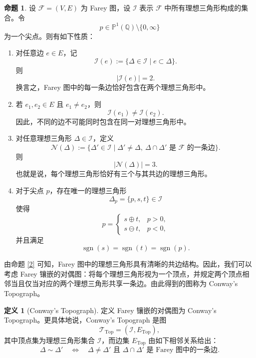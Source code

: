 \documentclass[10pt,UTF8]{ctexart}
\theoremstyle{definition}
\newtheorem{proposition}[theorem]{命题}
\newtheorem{definition}[theorem]{定义}
\theoremstyle{remark}
\begin{document}
\begin{proposition}{\label{2}}
设 \(\mathcal F=(V,E)\) 为 Farey 图，设 \(\mathcal I\) 表示 \(\mathcal F\) 中所有理想三角形构成的集合。令
\[
p\in \mathbb P^1(\mathbb Q)\setminus\{0,\infty\}
\]
为一个尖点。则有如下性质：
\begin{enumerate}
    \item 对任意边 \(e\in E\)，记
    \[
        \mathcal I(e):=\{\Delta\in\mathcal I\mid e\subset \Delta\}.
    \]
    则
    \[
        |\mathcal I(e)|=2.
    \]
    换言之，Farey 图中的每一条边恰好包含在两个理想三角形中。

    \item 若 \(e_1,e_2\in E\) 且 \(e_1\neq e_2\)，则
    \[
        \mathcal I(e_1)\neq \mathcal I(e_2).
    \]
    因此，不同的边不可能同时包含在同一对理想三角形中。

    \item 对任意理想三角形 \(\Delta\in\mathcal I\)，定义
    \[
        \mathcal N(\Delta)
        :=
        \{\Delta'\in\mathcal I\mid \Delta'\neq \Delta,\ 
        \Delta\cap\Delta' \text{ 是 } \mathcal F \text{ 的一条边}\}.
    \]
    则
    \[
        |\mathcal N(\Delta)|=3.
    \]
    也就是说，每个理想三角形恰好有三个与其共边的理想三角形。

    \item 对于尖点 \(p\)，存在唯一的理想三角形
    \[
        \Delta_p=\{p,s,t\}\in\mathcal I
    \]
    使得
    \[
        p=
        \begin{cases}
        s\oplus t, & p>0,\\
        s\ominus t, & p<0,
        \end{cases}
    \]
    并且满足
    \[
        \operatorname{sgn}(s)=\operatorname{sgn}(t)=\operatorname{sgn}(p).
    \]
\end{enumerate}
\end{proposition}

由命题 \ref{2} 可知，Farey 图中的理想三角形具有清晰的共边结构。因此，我们可以考虑 Farey 镶嵌的对偶图：将每个理想三角形视为一个顶点，并规定两个顶点相邻当且仅当对应的两个理想三角形共享一条边。由此得到的图称为 Conway's Topograph。

\begin{definition}[Conway's Topograph]
定义 Farey 镶嵌的对偶图为 Conway's Topograph。更具体地说，Conway's Topograph 是图
\[
    \mathcal T_{\mathrm{Top}}=(\mathcal I,E_{\mathrm{Top}}),
\]
其中顶点集为理想三角形集合 \(\mathcal I\)，而边集 \(E_{\mathrm{Top}}\) 由如下相邻关系给出：
\[
    \Delta\sim \Delta'
    \quad\Longleftrightarrow\quad
    \Delta\neq \Delta'
    \text{ 且 }
    \Delta\cap\Delta'
    \text{ 是 Farey 图中的一条边}.
\]
\end{definition}
\end{document}
